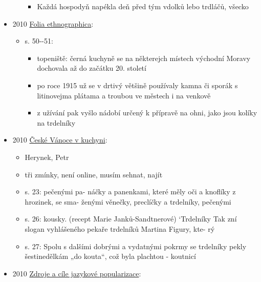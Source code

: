 \begin{itemize}
\begin{itemize}
    \begin{itemize}
    \tightlist
    \item
      Každá hospodyň napékla deň před tým vdolků lebo trdláčů, všecko
    \end{itemize}
  \end{itemize}
\item
  2010
  \href{https://ndk.cz/uuid/uuid:41ed2580-5e9b-11e4-8b87-001018b5eb5c}{Folia
  ethnographica}:

  \begin{itemize}
  \tightlist
  \item
    s. 50-\/-51:

    \begin{itemize}
    \tightlist
    \item
      topeniště: černá kuchyně se na některejch místech východní Moravy
      dochovala až do začátku 20. století
    \item
      po roce 1915 už se v drtivý většině používaly kamna či sporák s
      litinovejma plátama a troubou ve městech i na venkově
    \item
      z užívání pak vyšlo nádobí určený k přípravě na ohni, jako jsou
      kolíky na trdelníky
    \end{itemize}
  \end{itemize}
\item
  2010
  \href{https://ceskadigitalniknihovna.cz/uuid/uuid:0aef9650-0ddf-11e5-9eb3-005056827e52}{České
  Vánoce v kuchyni}:

  \begin{itemize}
  \tightlist
  \item
    Herynek, Petr
  \item
    tři zmínky, není online, musím sehnat, najít
  \item
    s. 23: pečenými pa- náčky a panenkami, které měly oči a knoflíky z
    hrozinek, se sma- ženými věnečky, preclíčky a trdelníky, pečenými
  \item
    s. 26: kousky. (recept Marie Janků-Sandtnerové) `Trdelníky Tak zní
    slogan vyhlášeného pekaře trdelníků Martina Figury, kte- rý
  \item
    s. 27: Spolu s dalšími dobrými a vydatnými pokrmy se trdelníky pekly
    šestinedělkám „do kouta``, což byla plachtou - koutnicí
  \end{itemize}
\item
  2010
  \href{https://ceskadigitalniknihovna.cz/uuid/uuid:467e18f0-1b9b-11e8-a0cf-005056827e52}{Zdroje
  a cíle jazykové popularizace}:


\end{itemize}
